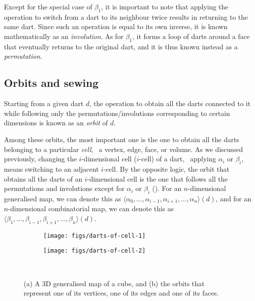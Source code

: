 Except for the special case of \(\beta_1\), it is important to note that applying the operation to switch from a dart to its neighbour twice results in returning to the same dart.
Since such an operation is equal to its own inverse, it is known mathematically as an \emph{involution}.
As for \(\beta_1\), it forms a loop of darts around a face that eventually returns to the original dart, and it is thus known instead as a \emph{permutation}.

\subsection{Orbits and sewing}

Starting from a given dart \(d\), the operation to obtain all the darts connected to it while following only the permutations/involutions corresponding to certain dimensions is known as an \emph{orbit} of \(d\).

Among these orbits, the most important one is the one to obtain all the darts belonging to a particular \emph{cell}, \ie\ a vertex, edge, face, or volume.
As we discussed previously, changing the \(i\)-dimensional cell (\(i\)-cell) of a dart, \ie\ applying \(\alpha_i\) or \(\beta_i\), means switching to an adjacent \(i\)-cell.
By the opposite logic, the orbit that obtains all the darts of an \(i\)-dimensional cell is the one that follows all the permutations and involutions except for \(\alpha_i\) or \(\beta_i\) ().
For an \(n\)-dimensional generalised map, we can denote this as \(\langle \alpha_0, \ldots, \alpha_{i-1}, \alpha_{i+1}, \ldots, \alpha_n \rangle(d)\), and for an \(n\)-dimensional combinatorial map, we can denote this as \(\langle \beta_1, \ldots, \beta_{i-1}, \beta_{i+1}, \ldots, \beta_n \rangle(d)\).

\begin{figure}
\centering
\begin{subfigure}{0.4\linewidth}
\texttt{[image: figs/darts-of-cell-1]}
\caption{}%
\label{subfig:darts-of-cell-1}
\end{subfigure}%
\quad
\begin{subfigure}{0.4\linewidth}
\texttt{[image: figs/darts-of-cell-2]}
\caption{}%
\label{subfig:darts-of-cell-2}
\end{subfigure}\\
\caption{(a) A 3D generalised map of a cube, and (b) the orbits that represent one of its vertices, one of its edges and one of its faces.}%
\label{fig:darts-of-cell}
\end{figure}

